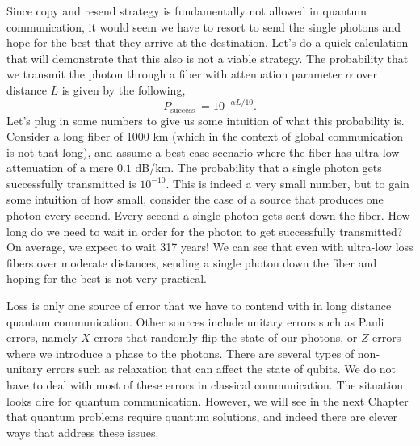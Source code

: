 Since copy and resend strategy is fundamentally not allowed in quantum communication, it would seem we have to resort to send the single photons and hope for the best that they arrive at the destination.
Let's do a quick calculation that will demonstrate that this also is not a viable strategy.
The probability that we transmit the photon through a fiber with attenuation parameter $\alpha$ over distance $L$ is given by the following,
\begin{equation}
    P_{\text {success }}=10^{-\alpha L / 10}.
\end{equation}
Let's plug in some numbers to give us some intuition of what this probability is.
Consider a long fiber of 1000 km (which in the context of global communication is not that long), and assume a best-case scenario where the fiber has ultra-low attenuation of a mere $0.1$ dB/km.
The probability that a single photon gets successfully transmitted is $10^{-10}$.
This is indeed a very small number, but to gain some intuition of how small, consider the case of a source that produces one photon every second.
Every second a single photon gets sent down the fiber.
How long do we need to wait in order for the photon to get successfully transmitted?
On average, we expect to wait 317 years!
We can see that even with ultra-low loss fibers over moderate distances, sending a single photon down the fiber and hoping for the best is not very practical.

Loss is only one source of error that we have to contend with in long distance quantum communication.
Other sources include unitary errors such as Pauli errors, namely $X$ errors that randomly flip the state of our photons, or $Z$ errors where we introduce a phase to the photons.
There are several types of non-unitary errors such as relaxation that can affect the state of qubits.
We do not have to deal with most of these errors in classical communication.
The situation looks dire for quantum communication.
However, we will see in the next Chapter that quantum problems require quantum solutions, and indeed there are clever ways that address these issues.





